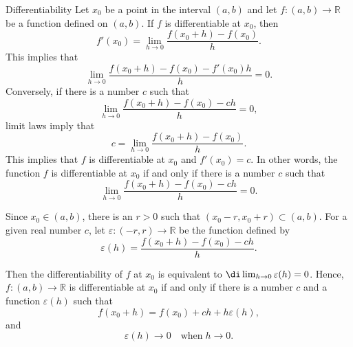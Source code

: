 \begin{highlight}{Differentiability}
Let $x_0$ be a point in the interval $(a, b)$ and let $f:(a,b)\rightarrow \mathbb{R}$ be a function defined on $(a, b)$. 
If $f$ is differentiable at $x_0$, then
\[f'(x_0)=\lim_{h\to 0}\frac{f(x_0+h)-f(x_0)}{h}.\]
This implies that
\[\lim_{h\to 0}\frac{f(x_0+h)-f(x_0)-f'(x_0)h}{h}=0.\]
Conversely, if there is a number $c$ such that
\[\lim_{h\to 0}\frac{f(x_0+h)-f(x_0)-ch}{h}=0,\]
limit laws imply that
\[c=\lim_{h\to 0}\frac{f(x_0+h)-f(x_0)}{h}.\]
This implies that $f$ is differentiable at $x_0$ and $f'(x_0)=c$.
In other words, the function $f$ is differentiable at $x_0$ if and only if there is a number $c$ such that
\[\lim_{h\to 0}\frac{f(x_0+h)-f(x_0)-ch}{h}=0.\]

Since $x_0\in (a, b)$, there is an $r>0$ such that $(x_0-r, x_0+r)\subset (a,b)$.  For a given real number $c$, let
$\varepsilon:(-r,r)\to\mathbb{R}$ be the function defined by
\[\varepsilon(h)=\frac{f(x_0+h)-f(x_0)-ch}{h}.\] \end{highlight}\begin{highlight}{} Then the differentiability of $f$ at $x_0$ is equivalent to $\di\lim_{h\rightarrow 0}\varepsilon(h)=0$.
Hence, $f:(a,b)\to\mathbb{R}$ is differentiable at $x_0$ if and only if there is a number $c$ and a function $\varepsilon(h)$ such that
\[f(x_0+h)=f(x_0)+ch+h\varepsilon(h),\]
and
\[\varepsilon(h)\to 0\quad\text{when}\;h\to 0.\]
\end{highlight}

